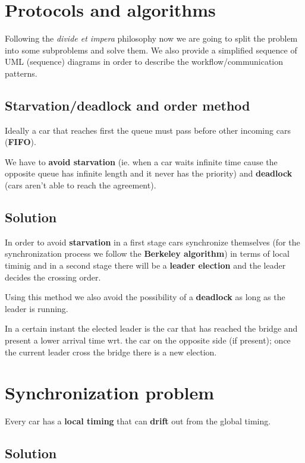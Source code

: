 \section{Protocols and algorithms}

Following the \textit{divide et impera} philosophy now we are going to split the problem 
into some subproblems and solve them. 
We also provide a simplified sequence of UML (sequence) diagrams in order to 
describe the workflow/communication patterns.


\subsection{Starvation/deadlock and order method}

Ideally a car that reaches first the queue must pass before other 
incoming cars (\textbf{FIFO}).

We have to \textbf{avoid starvation} (ie. when a car waits infinite time cause the opposite queue 
has infinite length and it never has the priority) and \textbf{deadlock} (cars aren't able to 
reach the agreement). 


\subsection{Solution}

In order to avoid \textbf{starvation} in a first stage cars synchronize themselves 
(for the synchronization process we follow the \textbf{Berkeley algorithm})
in terms of local timinig and in a second stage there will be a \textbf{leader election} 
and the leader decides the crossing order. 

Using this method we also avoid 
the possibility of a \textbf{deadlock} as long as the leader is running.

In a certain instant the elected leader is the car that has reached the bridge and 
present a lower arrival time wrt. the car on the opposite side (if present); 
once the current leader cross the bridge there is a new election.\\


\section{Synchronization problem}

Every car has a \textbf{local timing} that can \textbf{drift} out from the 
global timing. 


\subsection{Solution}

